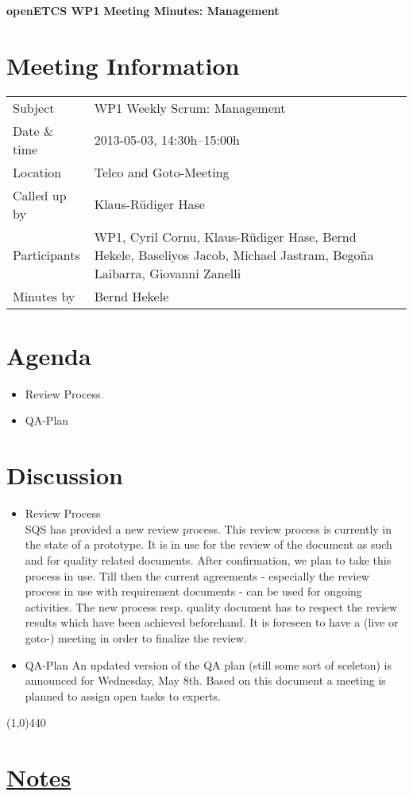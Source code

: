 \documentclass[a4paper, 11pt]{article}
\begin{document}
{\begin{center}\huge\bf openETCS WP1 Meeting Minutes: Management\end{center}}
\section{Meeting Information}

\renewcommand{\arraystretch}{1.5}
\begin{supertabular}{m{.2\textwidth}m{.8\textwidth}}
Subject & WP1 Weekly Scrum: Management\\
Date \& time & 2013-05-03, 14:30h--15:00h\\
Location & Telco and Goto-Meeting\\
Called up by & Klaus-R\"udiger Hase\\
Participants & WP1,
Cyril Cornu, 
Klaus-R\"udiger Hase,
Bernd Hekele,
Baseliyos Jacob,
Michael Jastram, 
Bego\~na Laibarra,
Giovanni Zanelli\\

Minutes by & Bernd Hekele\\

\end{supertabular}
\renewcommand{\arraystretch}{1.0}


\section{{Agenda}}
\begin{itemize}
\item Review Process
\item QA-Plan
\end{itemize}

\section{Discussion}
\begin{itemize}
\item Review Process\\SQS has provided a new review process. This review process is currently in the state of a prototype. It is in use for the review of the document as such and for quality related documents. After confirmation, we plan to take this process in use. Till then the current agreements - especially the review process in use with requirement documents - can be used for ongoing activities.
The new process resp. quality document has to respect the review results which have been achieved beforehand.
It is foreseen to have a (live or goto-) meeting in order to finalize the review.

\item QA-Plan
An updated version of the QA plan (still some sort of sceleton) is announced for Wednesday, May 8th.
Based on this document a meeting is planned to assign open tasks to experts.
\end{itemize}

\line(1,0){440}
\section{\underline{Notes}}
\end{document}
